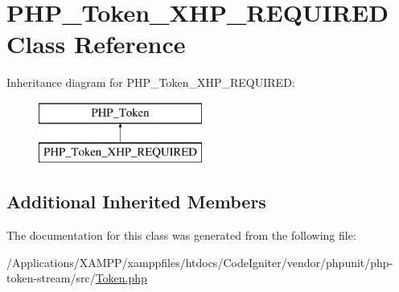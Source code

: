 \hypertarget{class_p_h_p___token___x_h_p___r_e_q_u_i_r_e_d}{}\section{P\+H\+P\+\_\+\+Token\+\_\+\+X\+H\+P\+\_\+\+R\+E\+Q\+U\+I\+R\+ED Class Reference}
\label{class_p_h_p___token___x_h_p___r_e_q_u_i_r_e_d}
Inheritance diagram for P\+H\+P\+\_\+\+Token\+\_\+\+X\+H\+P\+\_\+\+R\+E\+Q\+U\+I\+R\+ED\+:\begin{figure}[H]
\begin{center}
\leavevmode
\includegraphics[height=2.000000cm]{class_p_h_p___token___x_h_p___r_e_q_u_i_r_e_d}
\end{center}
\end{figure}
\subsection*{Additional Inherited Members}


The documentation for this class was generated from the following file\+:\begin{DoxyCompactItemize}
\item 
/\+Applications/\+X\+A\+M\+P\+P/xamppfiles/htdocs/\+Code\+Igniter/vendor/phpunit/php-\/token-\/stream/src/\mbox{\hyperlink{_token_8php}{Token.\+php}}\end{DoxyCompactItemize}
